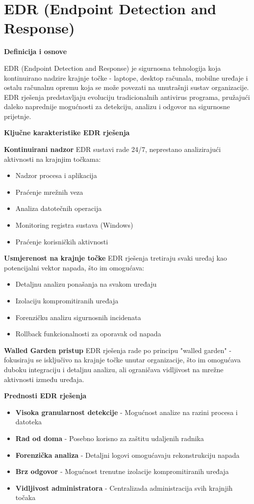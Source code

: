 \chapter{EDR (Endpoint Detection and Response)}

\textbf{Definicija i osnove}

EDR (Endpoint Detection and Response) je sigurnosna tehnologija koja kontinuirano nadzire krajnje točke - laptope, desktop računala, mobilne uređaje i ostalu računalnu opremu koja se može povezati na unutrašnji sustav organizacije. EDR rješenja predstavljaju evoluciju tradicionalnih antivirus programa, pružajući daleko naprednije mogućnosti za detekciju, analizu i odgovor na sigurnosne prijetnje.

\textbf{Ključne karakteristike EDR rješenja}

\textbf{Kontinuirani nadzor}
EDR sustavi rade 24/7, neprestano analizirajući aktivnosti na krajnjim točkama:
\begin{itemize}
\item Nadzor procesa i aplikacija
\item Praćenje mrežnih veza
\item Analiza datotečnih operacija
\item Monitoring registra sustava (Windows)
\item Praćenje korisničkih aktivnosti
\end{itemize}

\textbf{Usmjerenost na krajnje točke}
EDR rješenja tretiraju svaki uređaj kao potencijalni vektor napada, što im omogućava:
\begin{itemize}
\item Detaljnu analizu ponašanja na svakom uređaju
\item Izolaciju kompromitiranih uređaja
\item Forenzičku analizu sigurnosnih incidenata
\item Rollback funkcionalnosti za oporavak od napada
\end{itemize}

\textbf{Walled Garden pristup}
EDR rješenja rade po principu "walled garden" - fokusiraju se isključivo na krajnje točke unutar organizacije, što im omogućava duboku integraciju i detaljnu analizu, ali ograničava vidljivost na mrežne aktivnosti između uređaja.

\textbf{Prednosti EDR rješenja}

\begin{itemize}
\item \textbf{Visoka granularnost detekcije} - Mogućnost analize na razini procesa i datoteka
\item \textbf{Rad od doma} - Posebno korisno za zaštitu udaljenih radnika
\item \textbf{Forenzička analiza} - Detaljni logovi omogućavaju rekonstrukciju napada
\item \textbf{Brz odgovor} - Mogućnost trenutne izolacije kompromitiranih uređaja
\item \textbf{Vidljivost administratora} - Centralizada administracija svih krajnjih točaka
\end{itemize}

